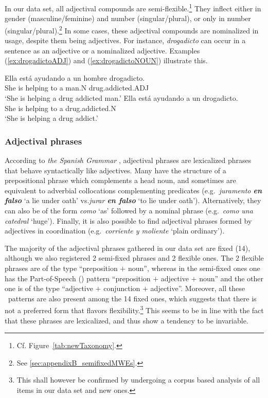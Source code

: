 \documentclass[output=paper]{langsci/langscibook}
\begin{document}
In our data set, all adjectival compounds are 
semi-flexible.\footnote{Cf.\@ 
Figure~\ref{tab:newTaxonomy}.}
They inflect either in gender (masculine/feminine) and number (singular/plural), or only in number (singular/plural).\footnote{See \ref{sec:appendixB_semifixedMWEs}.}
In some cases, these adjectival compounds are nominalized in usage, despite them being adjectives.
For instance, \textit{drogadicto} can occur in a sentence as an adjective or a nominalized adjective.
Examples (\ref{ex:drogadictoADJ}) and (\ref{ex:drogadictoNOUN}) illustrate this.

\begin{exe}
\ex \label{ex:drogadictoADJ}
\gll Ella está ayudando a un hombre drogadicto. \\
She is helping to a man.N {drug.addicted.ADJ} \\
\glt `She is helping a drug addicted man.'
\ex \label{ex:drogadictoNOUN}
\gll Ella está ayudando a un drogadicto. \\
She is helping to a {drug.addicted.N} \\
\glt `She is helping a drug addict.'
\end{exe}

\subsubsection{Adjectival phrases}

According to \textit{the Spanish Grammar} \citeyearpar[261]{RAE:2010}, adjectival phrases are lexicalized phrases that behave syntactically like adjectives. 
Many have the structure of a prepositional phrase which complements a head noun, and sometimes are equivalent to adverbial collocations complementing predicates (e.g.\ \textit{juramento \textbf{en falso}} `a lie under oath' vs.\@ \textit{jurar \textbf{en falso}} `to lie under oath').
Alternatively, they can also be of the form \textit{como} `as' followed by a nominal phrase (e.g.\ \textit{como una catedral} `huge').
Finally, it is also possible to find adjectival phrases formed by adjectives in coordination (e.g.\ \textit{corriente y moliente} `plain ordinary').

The majority of the adjectival phrases gathered in our data set are fixed (14), although we also registered 2 semi-fixed phrases and 2 flexible ones.
The 2 flexible phrases are of the type ``preposition $+$ noun'', whereas in the semi-fixed ones one has the Part-of-Speech (\pos) pattern ``preposition $+$ adjective $+$ noun'' and the other one is of the type ``adjective $+$ conjunction $+$ adjective''.
Moreover, all these \pos\ patterns are also present among the 14 fixed ones, which suggests that there is not a preferred form that flavors flexibility.\footnote{This shall however be confirmed by undergoing a corpus based analysis of all items in our data set and new ones.}
This seems to be in line with the fact that these phrases are lexicalized, and thus show a tendency to be invariable.
\end{document}
